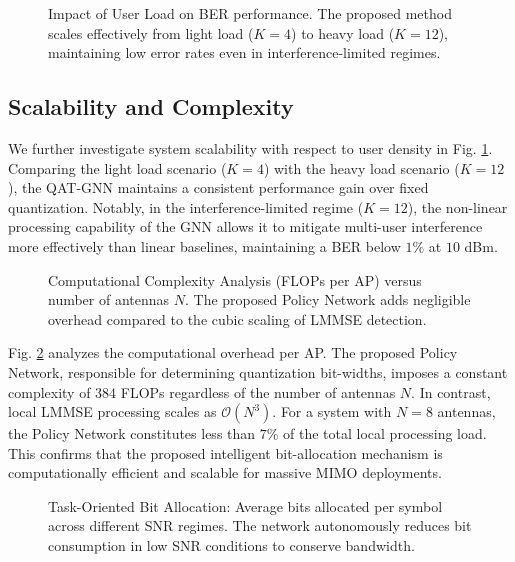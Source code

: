 \begin{figure}[t!]
    \centering
    
    \caption{Impact of User Load on BER performance. The proposed method scales effectively from light load ($K=4$) to heavy load ($K=12$), maintaining low error rates even in interference-limited regimes.}
    \label{fig:scalability}
\end{figure}

\subsection{Scalability and Complexity}
We further investigate system scalability with respect to user density in Fig. \ref{fig:scalability}. Comparing the light load scenario ($K=4$) with the heavy load scenario ($K=12$), the QAT-GNN maintains a consistent performance gain over fixed quantization. Notably, in the interference-limited regime ($K=12$), the non-linear processing capability of the GNN allows it to mitigate multi-user interference more effectively than linear baselines, maintaining a BER below $1\%$ at $10$ dBm.

\begin{figure}[t!]
    \centering
    
    \caption{Computational Complexity Analysis (FLOPs per AP) versus number of antennas $N$. The proposed Policy Network adds negligible overhead compared to the cubic scaling of LMMSE detection.}
    \label{fig:complexity}
\end{figure}

Fig. \ref{fig:complexity} analyzes the computational overhead per AP. The proposed Policy Network, responsible for determining quantization bit-widths, imposes a constant complexity of $384$ FLOPs regardless of the number of antennas $N$. In contrast, local LMMSE processing scales as $\mathcal{O}(N^3)$. For a system with $N=8$ antennas, the Policy Network constitutes less than $7\%$ of the total local processing load. This confirms that the proposed intelligent bit-allocation mechanism is computationally efficient and scalable for massive MIMO deployments.

\begin{figure}[t!]
    \centering
    
    \caption{Task-Oriented Bit Allocation: Average bits allocated per symbol across different SNR regimes. The network autonomously reduces bit consumption in low SNR conditions to conserve bandwidth.}
    \label{fig:bits}
\end{figure}

